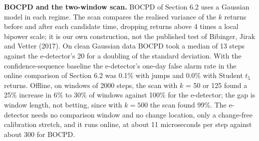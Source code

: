 \documentclass[
]{article}
\begin{document}
\textbf{BOCPD and the two-window scan.} BOCPD of Section 6.2 uses a
Gaussian model in each regime. The scan compares the realised variance
of the \(k\) returns before and after each candidate time, dropping
returns above 4 times a local bipower scale; it is our own construction,
not the published test of Bibinger, Jirak and Vetter (2017). On clean
Gaussian data BOCPD took a median of 13 steps against the e-detector's
20 for a doubling of the standard deviation. With the
confidence-sequence baseline the e-detector's one-day false alarm rate
in the online comparison of Section 6.2 was 0.1\% with jumps and 0.0\%
with Student \(t_5\) returns. Offline, on windows of 2000 steps, the
scan with \(k\) = 50 or 125 found a 25\% increase in 6\% to 30\% of
windows against 100\% for the e-detector; the gap is window length, not
betting, since with \(k = 500\) the scan found 99\%. The e-detector
needs no comparison window and no change location, only a change-free
calibration stretch, and it runs online, at about 11 microseconds per
step against about 300 for BOCPD.
\end{document}
